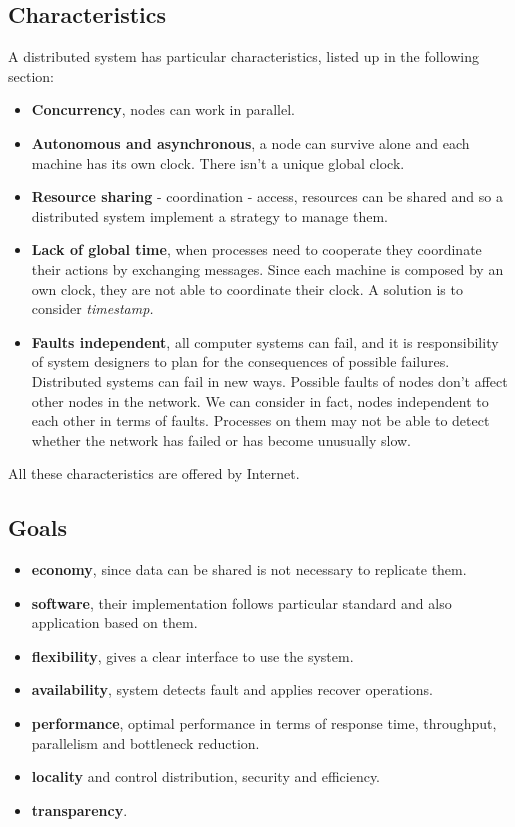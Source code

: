 \documentclass[11pt,a4paper]{article}
\begin{document}
\subsection{Characteristics}
A distributed system has particular characteristics, listed up in the following section:
\begin{itemize}
	\item \textbf{Concurrency}, nodes can work in parallel.
	\item \textbf{Autonomous and asynchronous}, a node can survive alone and each machine has its own clock. There isn't a unique global clock.
	\item \textbf{Resource sharing} - coordination - access, resources can be shared and so a distributed system implement a strategy to manage them. 
	\item \textbf{Lack of global time}, when processes need to cooperate they coordinate their actions by exchanging messages. Since each machine is composed by an own clock, they are not able to coordinate their clock. A solution is to consider \textit{timestamp.}
	\item \textbf{Faults independent}, all computer systems can fail, and it is responsibility of
	system designers to plan for the consequences of possible failures. Distributed systems
	can fail in new ways. Possible faults of nodes don't affect other nodes in the network. We can consider in fact, nodes independent to each other in terms of faults. Processes
	on them may not be able to detect whether the network has failed or has become
	unusually slow.
\end{itemize}
All these characteristics are offered by Internet.

\subsection{Goals}
\begin{itemize}
	\item \textbf{economy}, since data can be shared is not necessary to replicate them.
	\item \textbf{software}, their implementation follows particular standard and also application based on them.
	\item \textbf{flexibility}, gives a clear interface to use the system.
	\item \textbf{availability}, system detects fault and applies recover operations.
	\item \textbf{performance}, optimal performance in terms of response time, throughput, parallelism and bottleneck reduction.
	\item \textbf{locality} and control distribution, security and efficiency.
	\item \textbf{transparency}.
\end{itemize}
\end{document}

